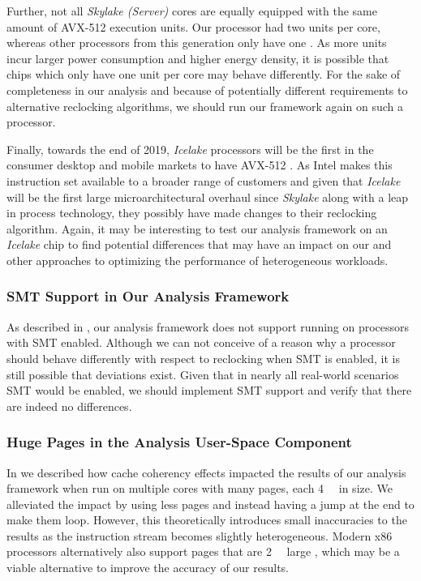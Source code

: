 Further, not all \textit{Skylake (Server)} cores are equally equipped with the same amount of \gls{AVX-512} execution units. Our processor had two units per core, whereas other processors from this generation only have one \cite{intelxeonscalabledeepdive}. As more units incur larger power consumption and higher energy density, it is possible that chips which only have one unit per core may behave differently. For the sake of completeness in our analysis and because of potentially different requirements to alternative reclocking algorithms, we should run our framework again on such a processor.

Finally, towards the end of 2019, \textit{Icelake} processors will be the first in the consumer desktop and mobile markets to have \gls{AVX-512} \cite{thicelake}. As Intel makes this instruction set available to a broader range of customers and given that \textit{Icelake} will be the first large microarchitectural overhaul since \textit{Skylake} along with a leap in process technology, they possibly have made changes to their reclocking algorithm. Again, it may be interesting to test our analysis framework on an \textit{Icelake} chip to find potential differences that may have an impact on our and other approaches to optimizing the performance of heterogeneous workloads.

\subsubsection{SMT Support in Our Analysis Framework}
\label{sec:conclusion:futurework:smt}

As described in , our analysis framework does not support running on processors with \gls{SMT} enabled. Although we can not conceive of a reason why a processor should behave differently with respect to reclocking when \gls{SMT} is enabled, it is still possible that deviations exist. Given that in nearly all real-world scenarios \gls{SMT} would be enabled, we should implement \gls{SMT} support and verify that there are indeed no differences.

\subsubsection{Huge Pages in the Analysis User-Space Component}
\label{sec:conclusion:futurework:hugepages}

In  we described how cache coherency effects impacted the results of our analysis framework when run on multiple cores with many pages, each \SI{4}{\kibi\byte} in size. We alleviated the impact by using less pages and instead having a jump at the end to make them loop. However, this theoretically introduces small inaccuracies to the results as the instruction stream becomes slightly heterogeneous. Modern \gls{x86} processors alternatively also support pages that are \SI{2}{\mebi\byte} large \cite{intelsdmsysprogguide}, which may be a viable alternative to improve the accuracy of our results.

